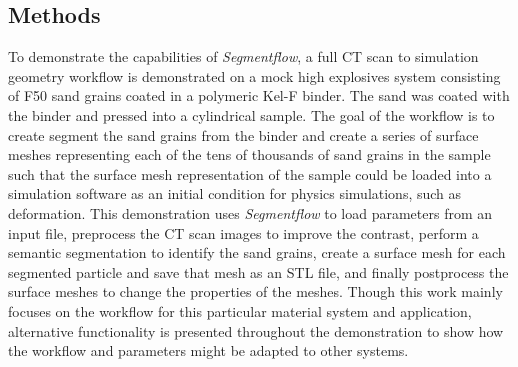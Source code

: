 \subsection{Methods}
To demonstrate the capabilities of \textit{Segmentflow},
a full CT scan to simulation geometry workflow is demonstrated on a
mock high explosives system
consisting of F50 sand grains coated in a polymeric Kel-F binder.
The sand was coated with the binder and pressed into a cylindrical
sample. The goal of the workflow is to create segment the sand grains from
the binder and create a series of surface meshes representing each of the
tens of thousands of sand grains in the sample such that the surface mesh
representation of the sample could be loaded into a simulation software as
an initial condition for physics simulations, such as deformation.
This demonstration uses \textit{Segmentflow} to load parameters from an
input file, preprocess the CT scan images to improve the contrast, perform
a semantic segmentation to identify the sand grains, create a surface mesh
for each segmented particle and save that mesh as an STL file, and finally
postprocess the surface meshes to change the properties of the meshes.
Though this work mainly focuses on the workflow for this particular material
system and application, alternative functionality is presented throughout
the demonstration to show how the workflow and parameters might be adapted
to other systems.

